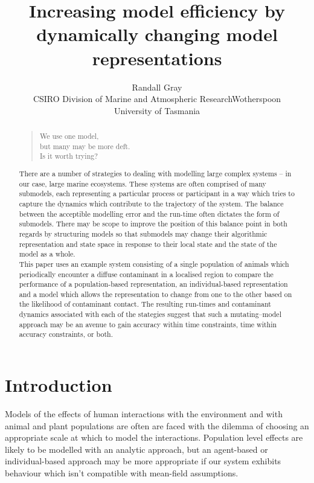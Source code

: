 \documentclass{article}
\begin{document}
\title{Increasing model efficiency by dynamically changing model
representations}\author{Randall Gray\\
CSIRO Division of Marine and Atmospheric Research\andSimon Wotherspoon\\
University of Tasmania}
\begin{abstract}
\begin{verse}
We use one model, \\
but many may be more deft. \\
Is it worth trying?
\end{verse}

There are a number of strategies to dealing with modelling large
complex systems -- in our case, large marine ecosystems. These systems
are often comprised of many submodels, each representing a particular
process or participant in a way which tries to capture the dynamics
which contribute to the trajectory of the system.  The balance between
the acceptible modelling error and the run-time often dictates the
form of submodels.  There may be scope to improve the position of this
balance point in both regards by structuring models so that submodels
may change their algorithmic representation and state space in
response to their local state and the state of the model as a whole.  
\\
This paper uses an example system consisting of a single population of
animals which periodically encounter a diffuse contaminant in a
localised region to compare the performance of a population-based
representation, an individual-based representation and a model which
allows the representation to change from one to the other based on the
likelihood of contaminant contact.  The resulting run-times and
contaminant dynamics associated with each of the stategies suggest
that such a mutating--model approach may be an avenue to gain accuracy
within time constraints, time within accuracy constraints, or both.
\end{abstract}


\maketitle

\section{Introduction}

Models of the effects of human interactions with the environment and with
animal and plant populations are often are faced with the dilemma of choosing
an appropriate scale at which to model the interactions. Population level
effects are likely to be modelled with an analytic approach, but an
agent-based or individual-based approach may be more appropriate if our system
exhibits behaviour which isn't compatible with mean-field assumptions.
\end{document}
